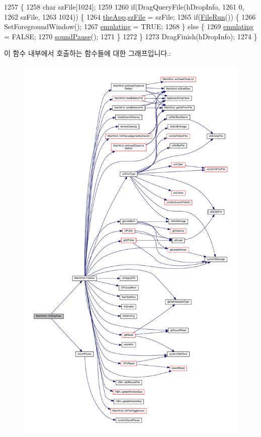 \begin{DoxyCode}
1257 \{
1258   \textcolor{keywordtype}{char} szFile[1024];
1259 
1260   \textcolor{keywordflow}{if}(DragQueryFile(hDropInfo,
1261                    0,
1262                    szFile,
1263                    1024)) \{
1264     \mbox{\hyperlink{_v_b_a_8cpp_a8095a9d06b37a7efe3723f3218ad8fb3}{theApp}}.\mbox{\hyperlink{class_v_b_a_ac85720ef4e00c5455be15266b7119045}{szFile}} = szFile;
1265     \textcolor{keywordflow}{if}(\mbox{\hyperlink{class_main_wnd_a946cd4793215a424eb736af418ccbc3d}{FileRun}}()) \{
1266       SetForegroundWindow();
1267       \mbox{\hyperlink{gb_globals_8h_af9cc36078b1b311753963297ae7f2a74}{emulating}} = TRUE;
1268     \} \textcolor{keywordflow}{else} \{
1269       \mbox{\hyperlink{gb_globals_8h_af9cc36078b1b311753963297ae7f2a74}{emulating}} = FALSE;
1270       \mbox{\hyperlink{_sound_8cpp_a0716e7957671de324eeaa4ac1729d6b7}{soundPause}}();
1271     \}
1272   \}
1273   DragFinish(hDropInfo);
1274 \}
\end{DoxyCode}
이 함수 내부에서 호출하는 함수들에 대한 그래프입니다.\+:
\nopagebreak
\begin{figure}[H]
\begin{center}
\leavevmode
\includegraphics[height=550pt]{class_main_wnd_a360d0179bc8f8ae13dfb4cdf573e2c55_cgraph}
\end{center}
\end{figure}
